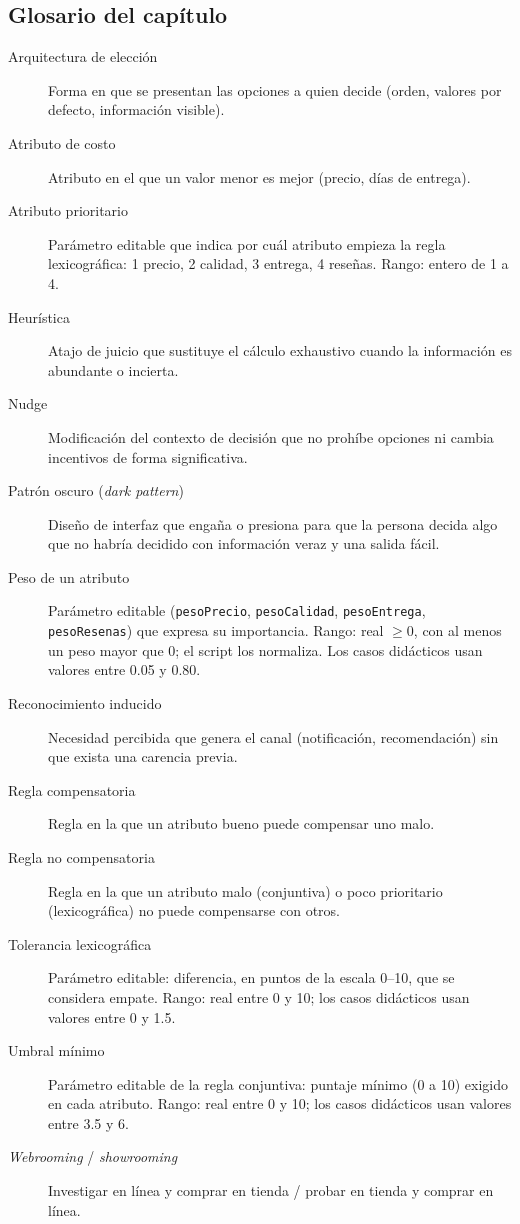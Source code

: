 \subsection*{Glosario del capítulo}
\begin{description}
  \item[Arquitectura de elección] Forma en que se presentan las opciones a quien decide (orden, valores por defecto, información visible).
  \item[Atributo de costo] Atributo en el que un valor menor es mejor (precio, días de entrega).
  \item[Atributo prioritario] Parámetro editable que indica por cuál atributo empieza la regla lexicográfica: 1 precio, 2 calidad, 3 entrega, 4 reseñas. Rango: entero de 1 a 4.
  \item[Heurística] Atajo de juicio que sustituye el cálculo exhaustivo cuando la información es abundante o incierta.
  \item[Nudge] Modificación del contexto de decisión que no prohíbe opciones ni cambia incentivos de forma significativa.
  \item[Patrón oscuro (\textit{dark pattern})] Diseño de interfaz que engaña o presiona para que la persona decida algo que no habría decidido con información veraz y una salida fácil.
  \item[Peso de un atributo] Parámetro editable (\texttt{pesoPrecio}, \texttt{pesoCalidad}, \texttt{pesoEntrega}, \texttt{pesoResenas}) que expresa su importancia. Rango: real $\ge 0$, con al menos un peso mayor que 0; el script los normaliza. Los casos didácticos usan valores entre 0.05 y 0.80.
  \item[Reconocimiento inducido] Necesidad percibida que genera el canal (notificación, recomendación) sin que exista una carencia previa.
  \item[Regla compensatoria] Regla en la que un atributo bueno puede compensar uno malo.
  \item[Regla no compensatoria] Regla en la que un atributo malo (conjuntiva) o poco prioritario (lexicográfica) no puede compensarse con otros.
  \item[Tolerancia lexicográfica] Parámetro editable: diferencia, en puntos de la escala 0--10, que se considera empate. Rango: real entre 0 y 10; los casos didácticos usan valores entre 0 y 1.5.
  \item[Umbral mínimo] Parámetro editable de la regla conjuntiva: puntaje mínimo (0 a 10) exigido en cada atributo. Rango: real entre 0 y 10; los casos didácticos usan valores entre 3.5 y 6.
  \item[\textit{Webrooming} / \textit{showrooming}] Investigar en línea y comprar en tienda / probar en tienda y comprar en línea.
\end{description}

